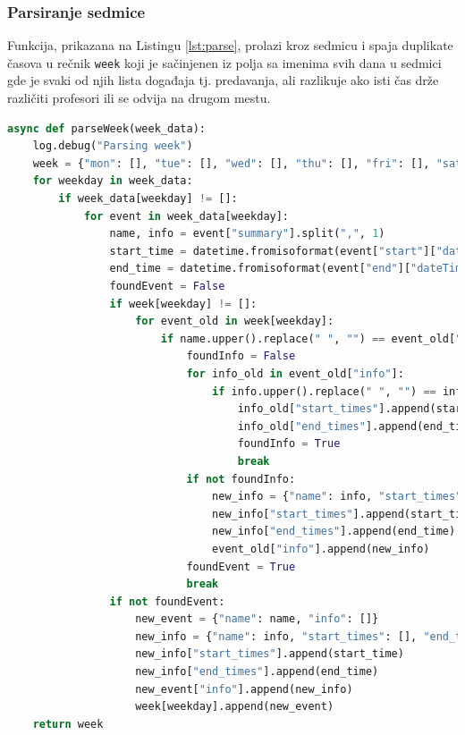 \documentclass[a4paper,11pt]{article}
\begin{document}
\subsubsection{Parsiranje sedmice}
Funkcija, prikazana na Listingu \ref{lst:parse}, prolazi kroz sedmicu i spaja duplikate časova u rečnik \texttt{week} koji je sačinjenen iz polja sa imenima svih dana u sedmici gde je svaki od njih lista događaja tj. predavanja, ali razlikuje ako isti čas drže različiti profesori ili se odvija na drugom mestu.
\begin{lstlisting}[language=Python, caption=Parsiranje sedmice, label=lst:parse]
async def parseWeek(week_data):
    log.debug("Parsing week")
    week = {"mon": [], "tue": [], "wed": [], "thu": [], "fri": [], "sat": [], "sun": []}
    for weekday in week_data:
        if week_data[weekday] != []:
            for event in week_data[weekday]:
                name, info = event["summary"].split(",", 1)
                start_time = datetime.fromisoformat(event["start"]["dateTime"]).strftime("%H:%M")
                end_time = datetime.fromisoformat(event["end"]["dateTime"]).strftime("%H:%M")
                foundEvent = False
                if week[weekday] != []:
                    for event_old in week[weekday]:
                        if name.upper().replace(" ", "") == event_old["name"].upper().replace(" ", ""):
                            foundInfo = False
                            for info_old in event_old["info"]:
                                if info.upper().replace(" ", "") == info_old["name"].upper().replace(" ", ""):
                                    info_old["start_times"].append(start_time)
                                    info_old["end_times"].append(end_time)
                                    foundInfo = True
                                    break
                            if not foundInfo:
                                new_info = {"name": info, "start_times": [], "end_times": []}
                                new_info["start_times"].append(start_time)
                                new_info["end_times"].append(end_time)
                                event_old["info"].append(new_info)
                            foundEvent = True
                            break
                if not foundEvent:
                    new_event = {"name": name, "info": []}
                    new_info = {"name": info, "start_times": [], "end_times": []}
                    new_info["start_times"].append(start_time)
                    new_info["end_times"].append(end_time)
                    new_event["info"].append(new_info)
                    week[weekday].append(new_event)
    return week
\end{lstlisting}
\end{document}
